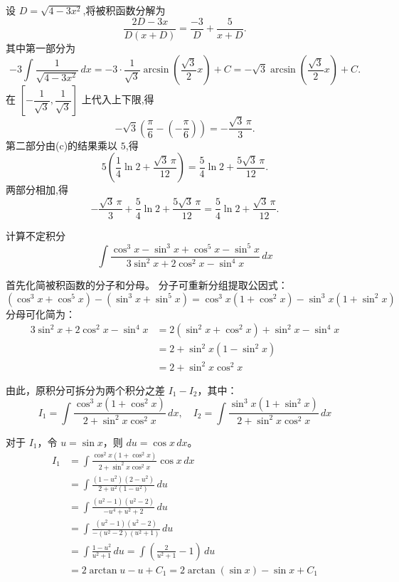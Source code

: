 \begin{questions}
\begin{parts}
\begin{solution}
设 $D=\sqrt{4-3x^2}$,将被积函数分解为
\[
\frac{2D-3x}{D(x+D)} = \frac{-3}{D} + \frac{5}{x+D}.
\]
其中第一部分为
\[
-3\int \frac{1}{\sqrt{4-3x^2}}\,dx = -3\cdot\frac{1}{\sqrt{3}}\arcsin\left(\frac{\sqrt{3}}{2}x\right)+C = -\sqrt{3}\arcsin\left(\frac{\sqrt{3}}{2}x\right)+C.
\]
在 $\left[-\dfrac{1}{\sqrt{3}},\dfrac{1}{\sqrt{3}}\right]$ 上代入上下限,得
\[
-\sqrt{3}\left(\frac{\pi}{6}-\left(-\frac{\pi}{6}\right)\right) = -\frac{\sqrt{3}\,\pi}{3}.
\]
第二部分由(c)的结果乘以 $5$,得
\[
5\left(\frac{1}{4}\ln 2+\frac{\sqrt{3}\,\pi}{12}\right) = \frac{5}{4}\ln 2 + \frac{5\sqrt{3}\,\pi}{12}.
\]
两部分相加,得
\[
-\frac{\sqrt{3}\,\pi}{3}+\frac{5}{4}\ln 2+\frac{5\sqrt{3}\,\pi}{12} = \frac{5}{4}\ln 2 + \frac{\sqrt{3}\,\pi}{12}.
\]
\end{solution}

\end{parts}

\question 计算不定积分
\[
\int \frac{\cos^3 x - \sin^3 x + \cos^5 x - \sin^5 x}{3\sin^2 x + 2\cos^2 x - \sin^4 x} \,dx
\]
\begin{solution}
首先化简被积函数的分子和分母。
分子可重新分组提取公因式：
\[
(\cos^3 x + \cos^5 x) - (\sin^3 x + \sin^5 x) = \cos^3 x(1 + \cos^2 x) - \sin^3 x(1 + \sin^2 x)
\]
分母可化简为：
\begin{align*}
3\sin^2 x + 2\cos^2 x - \sin^4 x &= 2(\sin^2 x + \cos^2 x) + \sin^2 x - \sin^4 x \\
&= 2 + \sin^2 x(1 - \sin^2 x) \\
&= 2 + \sin^2 x \cos^2 x
\end{align*}

由此，原积分可拆分为两个积分之差 $I_1 - I_2$，其中：
\[
I_1 = \int \frac{\cos^3 x(1 + \cos^2 x)}{2 + \sin^2 x \cos^2 x} \,dx, \quad I_2 = \int \frac{\sin^3 x(1 + \sin^2 x)}{2 + \sin^2 x \cos^2 x} \,dx
\]

对于 $I_1$，令 $u = \sin x$，则 $du = \cos x \,dx$。
\begin{align*}
I_1 &= \int \frac{\cos^2 x(1 + \cos^2 x)}{2 + \sin^2 x \cos^2 x} \cos x \,dx \\
&= \int \frac{(1 - u^2)(2 - u^2)}{2 + u^2(1 - u^2)} \,du \\
&= \int \frac{(u^2 - 1)(u^2 - 2)}{-u^4 + u^2 + 2} \,du \\
&= \int \frac{(u^2 - 1)(u^2 - 2)}{-(u^2 - 2)(u^2 + 1)} \,du \\
&= \int \frac{1 - u^2}{u^2 + 1} \,du = \int \left( \frac{2}{u^2 + 1} - 1 \right) \,du \\
&= 2\arctan u - u + C_1 = 2\arctan(\sin x) - \sin x + C_1
\end{align*}


\end{solution}
\end{questions}
